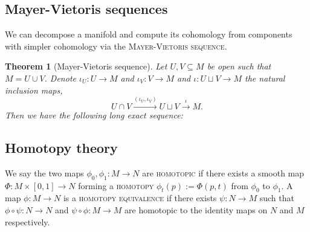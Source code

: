 \documentclass[reqno]{amsart}
\newtheorem{theorem}{Theorem}
\theoremstyle{definition}
\theoremstyle{remark}
\renewcommand{\emph}{\textsc}
\begin{document}
\subsection{Mayer-Vietoris sequences}

We can decompose a manifold and compute its cohomology from components with simpler cohomology via the \emph{Mayer-Vietoris sequence}. 

\begin{theorem}[Mayer-Vietoris sequence]
	Let $U, V \subseteq M$ be open such that $M = U \cup V$. Denote $\iota_U : U \to M$ and $\iota_V : V \to M$ and $\iota : U \sqcup V \to M$ the natural inclusion maps, 
		\[ U \cap V \overset{(\iota_U, \iota_V)}{\longrightarrow} U \sqcup V \overset{\iota}{\longrightarrow} M. \]
	Then we have the following long exact sequence:
	\begin{center}
	\end{center}
\end{theorem}

\subsection{Homotopy theory}

We say the two maps $\phi_0, \phi_1 : M \to N$ are \emph{homotopic} if there exists a smooth map $\Phi : M \times [0, 1] \to N$ forming a \emph{homotopy} $\phi_t (p) := \Phi(p, t)$ from $\phi_0$ to $\phi_1$. A map $\phi : M \to N$ is a \emph{homotopy equivalence} if there exists $\psi : N \to M$ such that $\phi \circ \psi : N \to N$ and $\psi \circ \phi : M \to M$ are homotopic to the identity maps on $N$ and $M$ respectively. 
\end{document}
